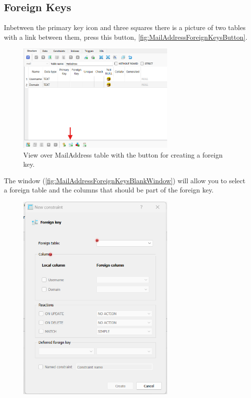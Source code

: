 \documentclass[a4paper,11pt,oneside]{article}
\begin{document}
\begin{sloppypar}
\subsection{Foreign Keys}
\label{sqliteStudioForeignKeys}
Inbetween the primary key icon and three squares there is a picture of two tables with a link between them, press this button, \autoref{fig:MailAddressForeignKeysButton}.
\begin{figure}[!htb]
  \centering
  \includegraphics[width=0.7\textwidth]{sqlitestudio/create_foreign_key/foreign_key_button_location.png}
  \caption{View over MailAddress table with the button for creating a foreign key.}
  \label{fig:MailAddressForeignKeysButton}
\end{figure}
The window (\autoref{fig:MailAddressForeignKeysBlankWindow}) will allow you to select a foreign table and the columns that should be part of the foreign key.
\begin{figure}[!htb]
  \centering
  \includegraphics[width=0.7\textwidth]{sqlitestudio/create_foreign_key/foreign_key_blank.png}

\end{figure}
\end{sloppypar}
\end{document}
